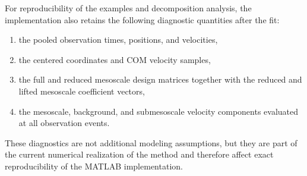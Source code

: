 For reproducibility of the examples and decomposition analysis, the implementation also retains
the following diagnostic quantities after the fit:
\begin{enumerate}
    \item the pooled observation times, positions, and velocities,
    \item the centered coordinates and COM velocity samples,
    \item the full and reduced mesoscale design matrices together with the reduced and lifted
    mesoscale coefficient vectors,
    \item the mesoscale, background, and submesoscale velocity components evaluated at all
    observation events.
\end{enumerate}
These diagnostics are not additional modeling assumptions, but they are part of the current
numerical realization of the method and therefore affect exact reproducibility of the MATLAB
implementation.
